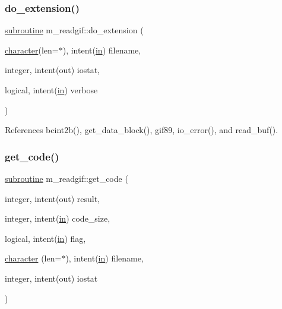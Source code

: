 \mbox{\label{namespacem__readgif_a93c5f69ee5054ba2c10ed17b8ab53f6b}} 
\subsubsection{\texorpdfstring{do\+\_\+extension()}{do\_extension()}}
{\footnotesize\ttfamily \hyperlink{M__stopwatch_83_8txt_acfbcff50169d691ff02d4a123ed70482}{subroutine} m\+\_\+readgif\+::do\+\_\+extension (\begin{DoxyParamCaption}\item[{\hyperlink{option__stopwatch_83_8txt_abd4b21fbbd175834027b5224bfe97e66}{character}(len=$\ast$), intent(\hyperlink{M__journal_83_8txt_afce72651d1eed785a2132bee863b2f38}{in})}]{filename,  }\item[{integer, intent(out)}]{iostat,  }\item[{logical, intent(\hyperlink{M__journal_83_8txt_afce72651d1eed785a2132bee863b2f38}{in})}]{verbose }\end{DoxyParamCaption})\hspace{0.3cm}{\ttfamily [private]}}



References bcint2b(), get\+\_\+data\+\_\+block(), gif89, io\+\_\+error(), and read\+\_\+buf().

\mbox{\label{namespacem__readgif_a027fedbf7ba68763483988c1aa6d2cea}} 
\subsubsection{\texorpdfstring{get\+\_\+code()}{get\_code()}}
{\footnotesize\ttfamily \hyperlink{M__stopwatch_83_8txt_acfbcff50169d691ff02d4a123ed70482}{subroutine} m\+\_\+readgif\+::get\+\_\+code (\begin{DoxyParamCaption}\item[{integer, intent(out)}]{result,  }\item[{integer, intent(\hyperlink{M__journal_83_8txt_afce72651d1eed785a2132bee863b2f38}{in})}]{code\+\_\+size,  }\item[{logical, intent(\hyperlink{M__journal_83_8txt_afce72651d1eed785a2132bee863b2f38}{in})}]{flag,  }\item[{\hyperlink{option__stopwatch_83_8txt_abd4b21fbbd175834027b5224bfe97e66}{character} (len=$\ast$), intent(\hyperlink{M__journal_83_8txt_afce72651d1eed785a2132bee863b2f38}{in})}]{filename,  }\item[{integer, intent(out)}]{iostat }\end{DoxyParamCaption})\hspace{0.3cm}{\ttfamily [private]}}



